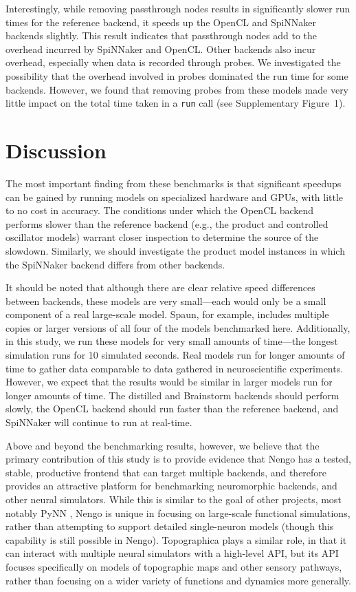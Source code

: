 \documentclass{frontiersSCNS}
\begin{document}
Interestingly, while removing passthrough nodes
results in significantly slower run times
for the reference backend,
it speeds up the OpenCL and SpiNNaker backends slightly.
This result indicates that passthrough nodes
add to the overhead incurred by
SpiNNaker and OpenCL.
Other backends also incur overhead,
especially when data is recorded
through probes.
We investigated the possibility
that the overhead involved in probes
dominated the run time for some backends.
However, we found that
removing probes from these models
made very little impact on
the total time taken in a \texttt{run} call
(see Supplementary Figure~1).

\section{Discussion}

The most important finding from these benchmarks
is that significant speedups can be gained by
running models on specialized hardware and GPUs,
with little to no cost in accuracy.
The conditions under which the OpenCL backend
performs slower than the reference backend
(e.g., the product and controlled oscillator models)
warrant closer inspection to determine the source
of the slowdown.
Similarly, we should investigate
the product model instances
in which the SpiNNaker backend
differs from other backends.

It should be noted that although there are clear
relative speed differences between backends,
these models are very small---each would only
be a small component of a real large-scale model.
Spaun, for example, includes multiple copies
or larger versions of all four of the models
benchmarked here.
Additionally, in this study, we run these models
for very small amounts of time---the longest
simulation runs for 10 simulated seconds.
Real models run for longer amounts of time
to gather data comparable to data gathered
in neuroscientific experiments.
However, we expect that the results
would be similar
in larger models run for longer amounts of time.
The distilled and Brainstorm backends should
perform slowly, the OpenCL backend should
run faster than the reference backend,
and SpiNNaker will continue to run at real-time.

Above and beyond the benchmarking results,
however, we believe that the primary contribution
of this study is to provide evidence that Nengo
has a tested, stable, productive frontend
that can target multiple backends,
and therefore provides an attractive platform
for benchmarking neuromorphic backends,
and other neural simulators.
While this is similar to the goal
of other projects, most notably PyNN \citep{davison2008},
Nengo is unique in focusing on
large-scale functional simulations,
rather than attempting to support
detailed single-neuron models
(though this capability is still possible in Nengo).
Topographica \citep{bednar2009} plays a similar role,
in that it can interact with multiple neural simulators
with a high-level API, but its API focuses specifically
on models of topographic maps
and other sensory pathways,
rather than focusing on
a wider variety of functions
and dynamics more generally.
\end{document}
